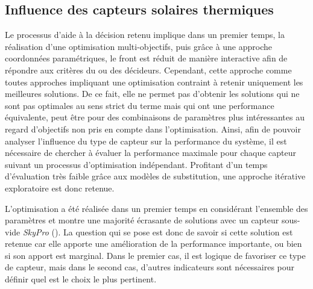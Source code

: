 



\subsection{Influence des capteurs solaires thermiques} %
\label{sub:influence_des_capteurs_solaires_thermiques}
Le processus d’aide à la décision retenu implique dans un premier temps, la réalisation
d’une optimisation multi-objectifs, puis grâce à une approche coordonnées paramétriques,
le front est réduit de manière interactive afin de répondre aux critères du ou des
décideurs. Cependant, cette approche comme toutes approches impliquant une optimisation
contraint à retenir uniquement les meilleures solutions. De ce fait, elle ne permet pas
d’obtenir les solutions qui ne sont pas optimales au sens strict du terme mais qui ont
une performance équivalente, peut être pour des combinaisons de paramètres plus
intéressantes au regard d’objectifs non pris en compte dans l’optimisation. Ainsi, afin de
pouvoir analyser l’influence du type de capteur sur la performance du système, il est
nécessaire de chercher à évaluer la performance maximale pour chaque capteur suivant un
processus d’optimisation indépendant. Profitant d’un temps d’évaluation très faible grâce
aux modèles de substitution, une approche itérative exploratoire est donc retenue.

L’optimisation a été réalisée dans un premier temps en considérant l’ensemble
des paramètres et montre une majorité écrasante de solutions avec un capteur
sous-vide \textit{SkyPro} (). La question qui se pose
est donc de savoir si cette solution est retenue car elle apporte une amélioration de la
performance importante, ou bien si son apport est marginal. Dans le premier cas, il est
logique de favoriser ce type de capteur, mais dans le second cas, d’autres indicateurs
sont nécessaires pour définir quel est le choix le plus pertinent.

